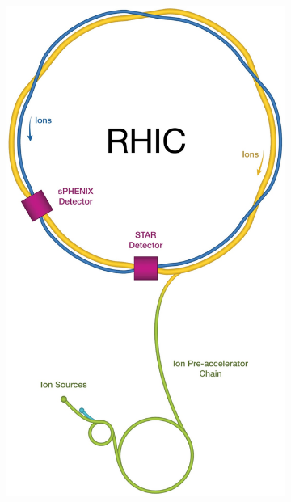 \begin{figure}[ht]
    \centering
    \begin{subfigure}{.25\linewidth}
        \includegraphics[width=\linewidth]{img/rhic.jpg}
        \caption{}
        \label{fig:eic:rhic}
    \end{subfigure}\hspace{.2\linewidth}
    \begin{subfigure}{.35\linewidth}

\end{subfigure}
\end{figure}
